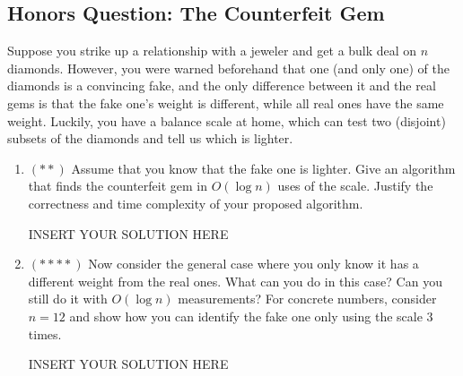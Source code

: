     



\subsection*{Honors Question: The Counterfeit Gem}
Suppose you strike up a relationship with a jeweler and get a bulk deal on $n$ diamonds. However, you were warned beforehand that one (and only one) of the diamonds is a convincing fake, and the only difference between it and the real gems is that the fake one's weight is different, while all real ones have the same weight. Luckily, you have a balance scale at home, which can test two (disjoint) subsets of the diamonds and tell us which is lighter. 

\begin{enumerate}
    \item $(**)$ Assume that you know that the fake one is lighter. Give an algorithm that finds the counterfeit gem in $O(\log n)$ uses of the scale. Justify the correctness and time complexity of your proposed algorithm.

\begin{solution}   INSERT YOUR SOLUTION HERE   \end{solution}

    \item $(****)$ Now consider the general case where you only know it has a different weight from the real ones. What can you do in this case? Can you still do it with $O(\log n)$ measurements? For concrete numbers, consider $n=12$ and show how you can identify the fake one only using the scale $3$ times.

\begin{solution}   INSERT YOUR SOLUTION HERE   \end{solution}
\end{enumerate}

